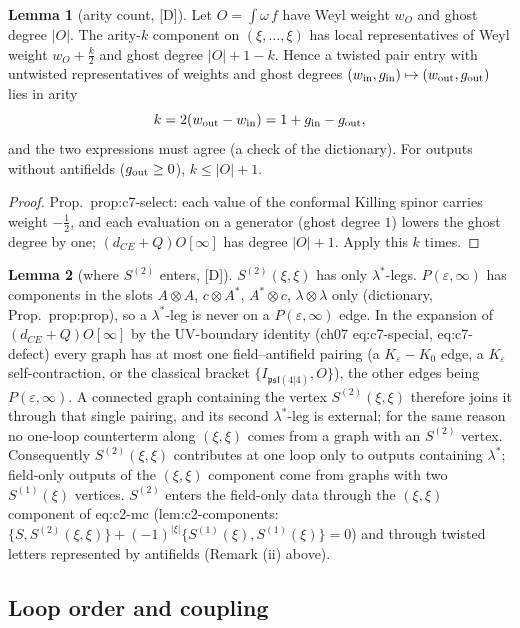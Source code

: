 \documentclass[11pt]{article}
\theoremstyle{definition}
\newtheorem{lemma}{Lemma}
\newcommand{\Dl}{\textup{[D]}}
\begin{document}
\begin{lemma}[arity count, \Dl]\label{lem:arity}
Let $O=\int\omega\,f$ have Weyl weight $w_O$ and ghost degree $|O|$. The arity-$k$ component on $(\xi,\dots,\xi)$ has local representatives of Weyl weight $w_O+\tfrac k2$ and ghost degree $|O|+1-k$. Hence a twisted pair entry with untwisted representatives of weights and ghost degrees $(w_{\rm in},g_{\rm in})\mapsto(w_{\rm out},g_{\rm out})$ lies in arity
\[
k=2(w_{\rm out}-w_{\rm in})=1+g_{\rm in}-g_{\rm out},
\]
and the two expressions must agree (a check of the dictionary). For outputs without antifields ($g_{\rm out}\ge0$), $k\le|O|+1$.
\end{lemma}
\begin{proof}
Prop.~prop:c7-select: each value of the conformal Killing spinor carries weight $-\tfrac12$, and each evaluation on a generator (ghost degree $1$) lowers the ghost degree by one; $(d_{CE}+Q)O[\infty]$ has degree $|O|+1$. Apply this $k$ times.
\end{proof}

\begin{lemma}[where $S^{(2)}$ enters, \Dl]\label{lem:S2}
$S^{(2)}(\xi,\xi)$ has only $\lambda^*$-legs. $P(\varepsilon,\infty)$ has components in the slots $A\otimes A$, $c\otimes A^*$, $A^*\otimes c$, $\lambda\otimes\lambda$ only (dictionary, Prop.~prop:prop), so a $\lambda^*$-leg is never on a $P(\varepsilon,\infty)$ edge. In the expansion of $(d_{CE}+Q)O[\infty]$ by the UV-boundary identity (ch07 eq:c7-special, eq:c7-defect) every graph has at most one field--antifield pairing (a $K_\varepsilon-K_0$ edge, a $K_\varepsilon$ self-contraction, or the classical bracket $\{I_{\mathfrak{psl}(4|4)},O\}$), the other edges being $P(\varepsilon,\infty)$. A connected graph containing the vertex $S^{(2)}(\xi,\xi)$ therefore joins it through that single pairing, and its second $\lambda^*$-leg is external; for the same reason no one-loop counterterm along $(\xi,\xi)$ comes from a graph with an $S^{(2)}$ vertex. Consequently $S^{(2)}(\xi,\xi)$ contributes at one loop only to outputs containing $\lambda^*$; field-only outputs of the $(\xi,\xi)$ component come from graphs with two $S^{(1)}(\xi)$ vertices. $S^{(2)}$ enters the field-only data through the $(\xi,\xi)$ component of eq:c2-mc (lem:c2-components: $\{S,S^{(2)}(\xi,\xi)\}+(-1)^{|\xi|}\{S^{(1)}(\xi),S^{(1)}(\xi)\}=0$) and through twisted letters represented by antifields (Remark (ii) above).
\end{lemma}

\subsection{Loop order and coupling}
\end{document}
